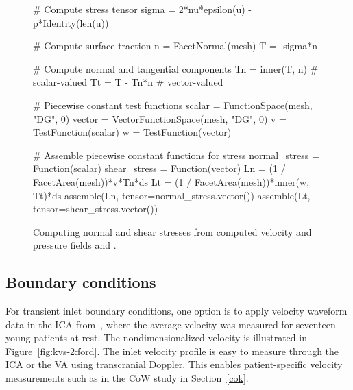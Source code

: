 \begin{figure}
  \begin{center} \label{fig:kvs-2:stress_code}
    \begin{python}
# Compute stress tensor
sigma = 2*nu*epsilon(u) - p*Identity(len(u))

# Compute surface traction
n = FacetNormal(mesh)
T = -sigma*n

# Compute normal and tangential components
Tn = inner(T, n) # scalar-valued
Tt = T - Tn*n    # vector-valued

# Piecewise constant test functions
scalar = FunctionSpace(mesh, "DG", 0)
vector = VectorFunctionSpace(mesh, "DG", 0)
v = TestFunction(scalar)
w = TestFunction(vector)

# Assemble piecewise constant functions for stress
normal_stress = Function(scalar)
shear_stress = Function(vector)
Ln = (1 / FacetArea(mesh))*v*Tn*ds
Lt = (1 / FacetArea(mesh))*inner(w, Tt)*ds
assemble(Ln, tensor=normal_stress.vector())
assemble(Lt, tensor=shear_stress.vector())
    \end{python}
    \caption{Computing normal and shear stresses from computed
      velocity and pressure fields  and .}
  \end{center}
\end{figure}

\subsection{Boundary conditions} \label{resistance_bcs}

For transient inlet boundary conditions, one option is to apply
velocity waveform data in the ICA
from~\citet{FordAlperinLeeEtAl2005}, where the average velocity was
measured for seventeen young patients at rest. The nondimensionalized
velocity is illustrated in Figure~\ref{fig:kvs-2:ford}. The inlet
velocity profile is easy to measure through the ICA or the
VA using transcranial Doppler. This enables
patient-specific velocity measurements such as in the CoW study in
Section~\ref{cok}.



